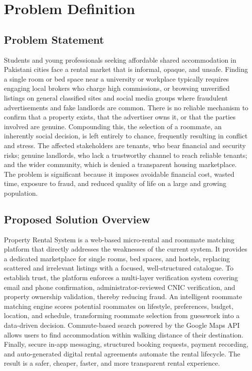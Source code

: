 
\chapter{Problem Definition}

\section{Problem Statement}

Students and young professionals seeking affordable shared accommodation in Pakistani cities face a rental market that is informal, opaque, and unsafe. Finding a single room or bed space near a university or workplace typically requires engaging local brokers who charge high commissions, or browsing unverified listings on general classified sites and social media groups where fraudulent advertisements and fake landlords are common. There is no reliable mechanism to confirm that a property exists, that the advertiser owns it, or that the parties involved are genuine. Compounding this, the selection of a roommate, an inherently social decision, is left entirely to chance, frequently resulting in conflict and stress. The affected stakeholders are tenants, who bear financial and security risks; genuine landlords, who lack a trustworthy channel to reach reliable tenants; and the wider community, which is denied a transparent housing marketplace. The problem is significant because it imposes avoidable financial cost, wasted time, exposure to fraud, and reduced quality of life on a large and growing population.


\section{Proposed Solution Overview}

Property Rental System is a web-based micro-rental and roommate matching platform that directly addresses the weaknesses of the current system. It provides a dedicated marketplace for single rooms, bed spaces, and hostels, replacing scattered and irrelevant listings with a focused, well-structured catalogue. To establish trust, the platform enforces a multi-layer verification system covering email and phone confirmation, administrator-reviewed CNIC verification, and property ownership validation, thereby reducing fraud. An intelligent roommate matching engine scores potential roommates on lifestyle, preferences, budget, location, and schedule, transforming roommate selection from guesswork into a data-driven decision. Commute-based search powered by the Google Maps API allows users to find accommodation within walking distance of their destination. Finally, secure in-app messaging, structured booking requests, payment recording, and auto-generated digital rental agreements automate the rental lifecycle. The result is a safer, cheaper, faster, and more transparent rental experience.


